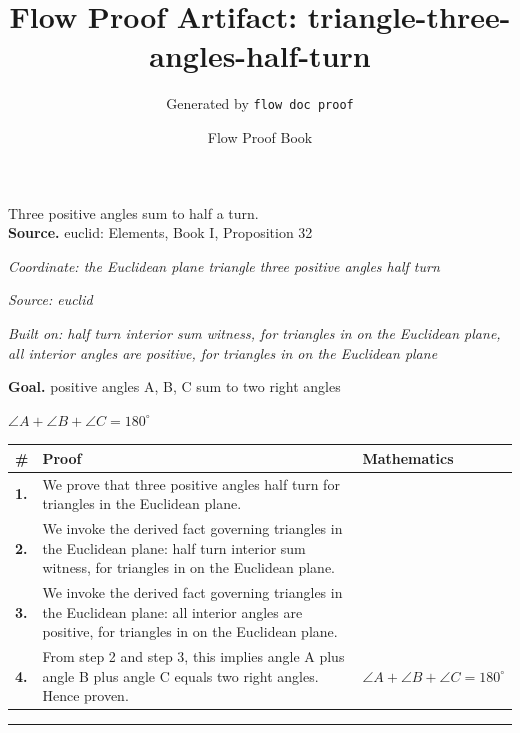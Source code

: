 \documentclass[11pt]{article}
\title{Flow Proof Artifact: triangle-three-angles-half-turn}
\author{Generated by \texttt{flow doc proof}}
\date{Flow Proof Book}
\theoremstyle{definition}
\begin{document}
\maketitle
Three positive angles sum to half a turn.\\[0.5em]
\textbf{Source.} euclid: Elements, Book I, Proposition 32\\[0.5em]
\bigskip
{}\par
\smallskip\noindent\textit{Coordinate: the Euclidean plane \cdot triangle \cdot three positive angles half turn}\par
\smallskip\noindent\textit{Source: euclid}\par
\smallskip\noindent\textit{Built on: half turn interior sum witness, for triangles in on the Euclidean plane, all interior angles are positive, for triangles in on the Euclidean plane}\par
\medskip
\noindent\textbf{Goal.} positive angles A, B, C sum to two right angles\par
\noindent$\displaystyle \angle A + \angle B + \angle C = 180^\circ$\par
\medskip
\noindent
\begin{tabular}{@{} >{\raggedright\arraybackslash}p{} >{\raggedright\arraybackslash}p{} >{\raggedleft\arraybackslash}p{} @{}}
\textbf{\#} & \textbf{Proof} & \textbf{Mathematics} \\
\midrule
\textbf{1.} & We prove that three positive angles half turn for triangles in the Euclidean plane. & \\[0.45em]
\textbf{2.} & We invoke the derived fact governing triangles in the Euclidean plane: half turn interior sum witness, for triangles in on the Euclidean plane. & \\[0.45em]
\textbf{3.} & We invoke the derived fact governing triangles in the Euclidean plane: all interior angles are positive, for triangles in on the Euclidean plane. & \\[0.45em]
\textbf{4.} & From step 2 and step 3, this implies angle A plus angle B plus angle C equals two right angles. Hence proven. & $\displaystyle \angle A + \angle B + \angle C = 180^\circ$ \\[0.45em]
\bottomrule
\end{tabular}
\label{thm:Geometry-triangle-three_positive_angles_half_turn}
\par\medskip\hrule
\end{document}
